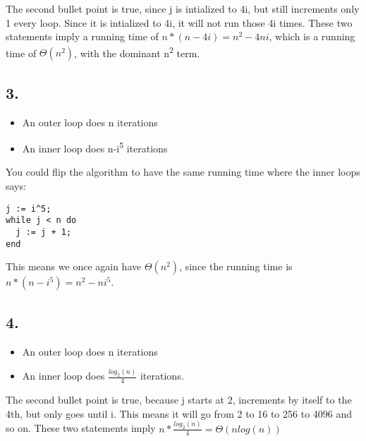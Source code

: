 \documentclass[]{article}
\providecommand{\tightlist}{%
  \setlength{\itemsep}{0pt}\setlength{\parskip}{0pt}}
\begin{document}
The second bullet point is true, since j is intialized to 4i, but still
increments only 1 every loop. Since it is intialized to 4i, it will not
run those 4i times. These two statements imply a running time of
\(n * (n-4i) = n^2-4ni\), which is a running time of \(\Theta(n^2)\),
with the dominant n\textsuperscript{2} term.

\pagebreak

\subsection{3.}\label{section-2}

\begin{itemize}
\tightlist
\item
  An outer loop does n iterations
\item
  An inner loop does n-i\textsuperscript{5} iterations
\end{itemize}

You could flip the algorithm to have the same running time where the
inner loops says:

\begin{verbatim}
j := i^5;
while j < n do
  j := j + 1;
end
\end{verbatim}

This means we once again have \(\Theta(n^2)\), since the running time is
\(n*(n-i^5)=n^2-ni^5\).

\pagebreak

\subsection{4.}\label{section-3}

\begin{itemize}
\tightlist
\item
  An outer loop does n iterations
\item
  An inner loop does \(\frac{log_2(n)}{4}\) iterations.
\end{itemize}

The second bullet point is true, because j starts at 2, increments by
itself to the 4th, but only goes until i. This means it will go from 2
to 16 to 256 to 4096 and so on. These two statements imply
\(n * \frac{log_2(n)}{4} = \Theta(nlog(n))\)
\end{document}
